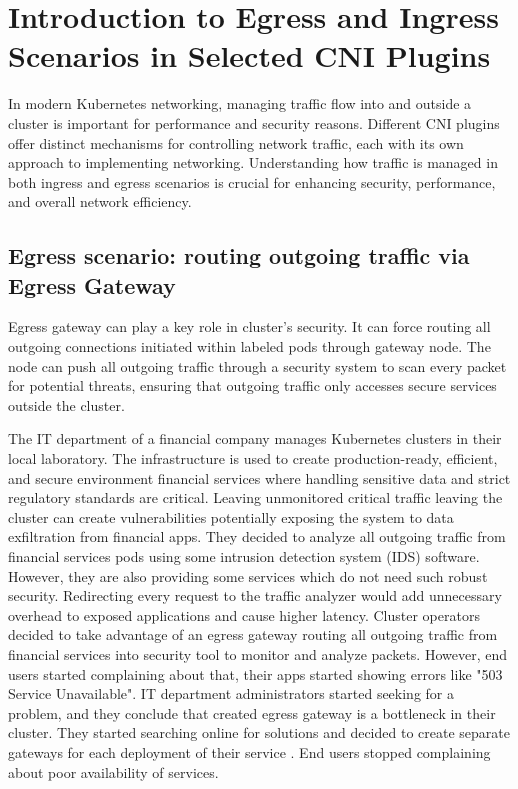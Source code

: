 \chapter{Introduction to Egress and Ingress Scenarios in Selected CNI Plugins}
\label{cha:introScenarios}
In modern Kubernetes networking, managing traffic flow into and outside a cluster is important for performance and security reasons. Different CNI plugins offer distinct mechanisms for controlling network traffic, each with its own approach to implementing networking. Understanding how traffic is managed in both ingress and egress scenarios is crucial for enhancing security, performance, and overall network efficiency.

\section{Egress scenario: routing outgoing traffic via Egress Gateway}
\label{sec:egress}

Egress gateway can play a key role in cluster's security. It can force routing all outgoing connections initiated within labeled pods through gateway node. The node can push all outgoing traffic through a security system to scan every packet for potential threats, ensuring that outgoing traffic only accesses secure services outside the cluster.

The IT department of a financial company manages Kubernetes clusters in their local laboratory. The infrastructure is used to create production-ready, efficient, and secure environment financial services where handling sensitive data and strict regulatory standards are critical. Leaving unmonitored critical traffic leaving the cluster can create vulnerabilities potentially exposing the system to data exfiltration from financial apps. They decided to analyze all outgoing traffic from financial services pods using some intrusion detection system (IDS) software. However, they are also providing some services which do not need such robust security. Redirecting every request to the traffic analyzer would add unnecessary overhead to exposed applications and cause higher latency. Cluster operators decided to take advantage of an egress gateway routing all outgoing traffic from financial services into security tool to monitor and analyze packets. However, end users started complaining about that, their apps started showing errors like "503 Service Unavailable". IT department  administrators started seeking for a problem, and they conclude that created egress gateway is a bottleneck in their cluster. They started searching online for solutions and decided to create separate gateways for each deployment of their service \cite{CalicoEgressDeploy}. End users stopped complaining about poor availability of services.

